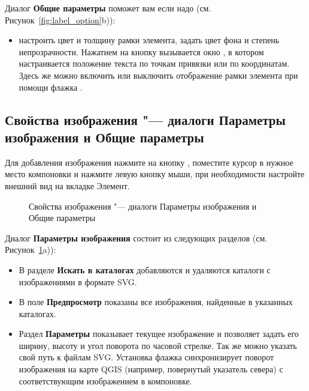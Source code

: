 
Диалог \textbf{Общие параметры} поможет вам если надо
(см. Рисунок~\ref{fig:label_option}b)):

\begin{itemize}[label=--]
\item настроить цвет и толщину рамки элемента, задать
цвет фона и степень непрозрачности. Нажатием на кнопку 
вызывается окно , в котором настраивается
положение текста по точкам привязки или по координатам. Здесь же можно
включить или выключить отображение рамки элемента при помощи флажка
.
\end{itemize}

\subsection{Свойства изображения "--- диалоги Параметры изображения и Общие параметры}

Для добавления изображения нажмите на кнопку
, поместите
курсор в нужное место компоновки и нажмите левую кнопку мыши, при
необходимости настройте внешний вид на вкладке Элемент.

\begin{figure}[ht]
\centering
     \hspace{1cm}
   \caption{Свойства изображения "--- диалоги Параметры изображения и Общие параметры \nixcaption}\label{fig:imageoptions}
\end{figure}


Диалог \textbf{Параметры изображения} состоит из следующих
разделов (см. Рисунок~\ref{fig:imageoptions}a)):

\begin{itemize}[label=--]
\item В разделе \textbf{Искать в каталогах} добавляются и удаляются
каталоги с изображениями в формате SVG.
\item В поле \textbf{Предпросмотр} показаны все изображения, найденные
в указанных каталогах.
\item Раздел \textbf{Параметры} показывает текущее изображение и
позволяет задать его ширину, высоту и угол поворота по часовой стрелке.
Так же можно указать свой путь к файлам SVG. Установка флажка
 синхронизирует поворот изображения
на карте QGIS (например, повернутый указатель севера) с соответствующим
изображением в компоновке.
\end{itemize}

